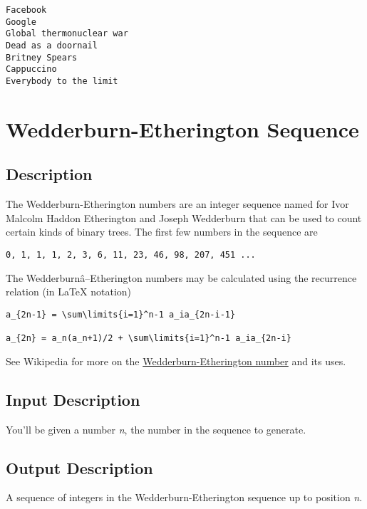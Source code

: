 \begin{lstlisting}
Facebook
Google
Global thermonuclear war
Dead as a doornail
Britney Spears
Cappuccino
Everybody to the limit
\end{lstlisting}


\section{Wedderburn-Etherington Sequence}

\subsection*{Description}\label{description-41}

The Wedderburn-Etherington numbers are an integer sequence named for
Ivor Malcolm Haddon Etherington and Joseph Wedderburn that can be used
to count certain kinds of binary trees. The first few numbers in the
sequence are

\begin{lstlisting}
0, 1, 1, 1, 2, 3, 6, 11, 23, 46, 98, 207, 451 ...
\end{lstlisting}

The Wedderburnâ--Etherington numbers may be calculated using the
recurrence relation (in LaTeX notation)

\begin{lstlisting}
a_{2n-1} = \sum\limits{i=1}^n-1 a_ia_{2n-i-1}

a_{2n} = a_n(a_n+1)/2 + \sum\limits{i=1}^n-1 a_ia_{2n-i}
\end{lstlisting}

See Wikipedia for more on the
\href{http://en.wikipedia.org/wiki/Wedderburn\%E2\%80\%93Etherington_number}{Wedderburn-Etherington
number} and its uses.

\subsection*{Input Description}\label{input-description-29}

You'll be given a number \emph{n}, the number in the sequence to
generate.

\subsection*{Output Description}\label{output-description-30}

A sequence of integers in the Wedderburn-Etherington sequence up to
position \emph{n}.


